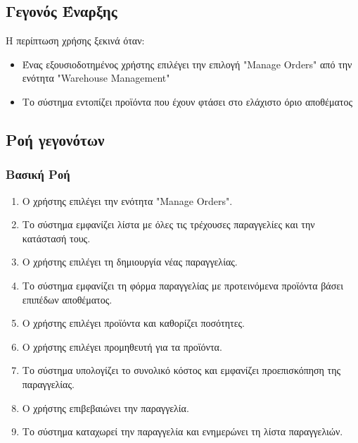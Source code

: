 \documentclass[12pt,a4paper,twoside]{book}
\begin{document}
\subsection{Γεγονός Έναρξης}
Η περίπτωση χρήσης ξεκινά όταν:
\begin{itemize}
  \item Ένας εξουσιοδοτημένος χρήστης επιλέγει την επιλογή "Manage Orders" από την ενότητα "Warehouse Management" %
  \item Το σύστημα εντοπίζει προϊόντα που έχουν φτάσει στο ελάχιστο όριο αποθέματος
\end{itemize}

\subsection{Ροή γεγονότων}

\subsubsection{Βασική Ροή}
\begin{enumerate}
  \item Ο χρήστης επιλέγει την ενότητα "Manage Orders". %
  \item Το σύστημα εμφανίζει λίστα με όλες τις τρέχουσες παραγγελίες και την κατάστασή τους.
  \item Ο χρήστης επιλέγει τη δημιουργία νέας παραγγελίας. %
  \item Το σύστημα εμφανίζει τη φόρμα παραγγελίας με προτεινόμενα προϊόντα βάσει επιπέδων αποθέματος. %
  \item Ο χρήστης επιλέγει προϊόντα και καθορίζει ποσότητες.
  \item Ο χρήστης επιλέγει προμηθευτή για τα προϊόντα.
  \item Το σύστημα υπολογίζει το συνολικό κόστος και εμφανίζει προεπισκόπηση της παραγγελίας.
  \item Ο χρήστης επιβεβαιώνει την παραγγελία.
  \item Το σύστημα καταχωρεί την παραγγελία και ενημερώνει τη λίστα παραγγελιών.
\end{enumerate}
\end{document}
